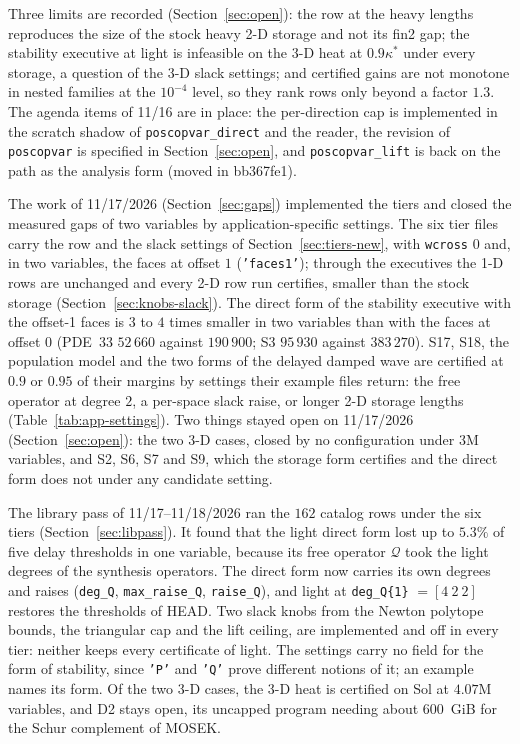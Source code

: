 \documentclass[12pt]{article}
\newcommand{\mcl}[1]{\mathcal{#1}}
\newcommand{\code}[1]{\texttt{#1}}
\newcommand{\gapsref}{Section~\ref{sec:gaps}}
\theoremstyle{plain}
\theoremstyle{definition}
\theoremstyle{remark}
\begin{document}
Three limits are recorded (Section~\ref{sec:open}): the row at the heavy lengths reproduces the size of the stock heavy 2-D storage and not its fin2 gap; the stability executive at light is infeasible on the 3-D heat at $0.9\kappa^*$ under every storage, a question of the 3-D slack settings; and certified gains are not monotone in nested families at the $10^{-4}$ level, so they rank rows only beyond a factor $1.3$. The agenda items of 11/16 are in place: the per-direction cap is implemented in the scratch shadow of \code{poscopvar\_direct} and the reader, the revision of \code{poscopvar} is specified in Section~\ref{sec:open}, and \code{poscopvar\_lift} is back on the path as the analysis form (moved in bb367fe1).

The work of 11/17/2026 (\gapsref) implemented the tiers and closed the measured gaps of two variables by application-specific settings. The six tier files carry the row and the slack settings of Section~\ref{sec:tiers-new}, with \code{wcross} $0$ and, in two variables, the faces at offset $1$ (\code{'faces1'}); through the executives the 1-D rows are unchanged and every 2-D row run certifies, smaller than the stock storage (Section~\ref{sec:knobs-slack}). The direct form of the stability executive with the offset-1 faces is $3$ to $4$ times smaller in two variables than with the faces at offset $0$ (PDE~33 $52\,660$ against $190\,900$; S3 $95\,930$ against $383\,270$). S17, S18, the population model and the two forms of the delayed damped wave are certified at $0.9$ or $0.95$ of their margins by settings their example files return: the free operator at degree $2$, a per-space slack raise, or longer 2-D storage lengths (Table~\ref{tab:app-settings}). Two things stayed open on 11/17/2026 (Section~\ref{sec:open}): the two 3-D cases, closed by no configuration under $3$M variables, and S2, S6, S7 and S9, which the storage form certifies and the direct form does not under any candidate setting.

The library pass of 11/17--11/18/2026 ran the $162$ catalog rows under the six tiers (Section~\ref{sec:libpass}). It found that the light direct form lost up to $5.3\%$ of five delay thresholds in one variable, because its free operator $\mcl Q$ took the light degrees of the synthesis operators. The direct form now carries its own degrees and raises (\code{deg\_Q}, \code{max\_raise\_Q}, \code{raise\_Q}), and light at \code{deg\_Q\{1\}} $=[4\ 2\ 2]$ restores the thresholds of HEAD. Two slack knobs from the Newton polytope bounds, the triangular cap and the lift ceiling, are implemented and off in every tier: neither keeps every certificate of light. The settings carry no field for the form of stability, since \code{'P'} and \code{'Q'} prove different notions of it; an example names its form. Of the two 3-D cases, the 3-D heat is certified on Sol at $4.07$M variables, and D2 stays open, its uncapped program needing about $600$~GiB for the Schur complement of MOSEK.
\end{document}
